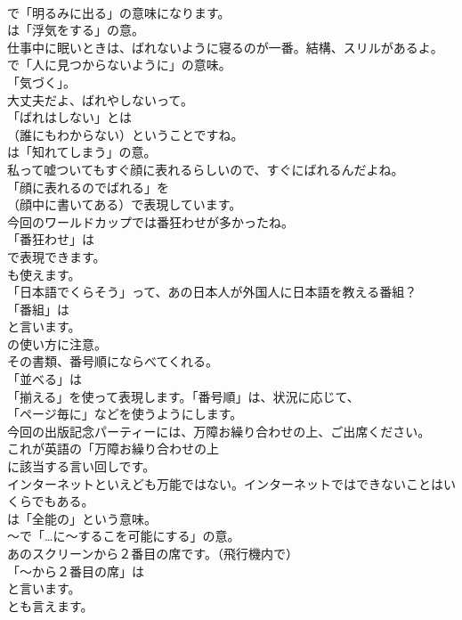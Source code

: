 \documentclass[8pt]{extreport}
\begin{document}
\begin{CJK}{UTF8}{min}
\\	で「明るみに出る」の意味になります。
\\	は「浮気をする」の意。	
\\	仕事中に眠いときは、ばれないように寝るのが一番。結構、スリルがあるよ。 
\\	で「人に見つからないように」の意味。
\\	「気づく」。	
\\	大丈夫だよ、ばれやしないって。 
\\	「ばれはしない」とは 
\\	（誰にもわからない）ということですね。
\\	は「知れてしまう」の意。	
\\	私って嘘ついてもすぐ顔に表れるらしいので、すぐにばれるんだよね。 
\\	「顔に表れるのでばれる」を 
\\	（顔中に書いてある）で表現しています。	
\\	今回のワールドカップでは番狂わせが多かったね。 
\\	「番狂わせ」は 
\\	で表現できます。
\\	も使えます。	
\\	「日本語でくらそう」って、あの日本人が外国人に日本語を教える番組？ 
\\	「番組」は
\\	と言います。
\\	の使い方に注意。	
\\	その書類、番号順にならべてくれる。 
\\	「並べる」は
\\	「揃える」を使って表現します。「番号順」は、状況に応じて、
\\	「ページ毎に」などを使うようにします。	
\\	今回の出版記念パーティーには、万障お繰り合わせの上、ご出席ください。 
\\	これが英語の「万障お繰り合わせの上 
\\	に該当する言い回しです。	
\\	インターネットといえども万能ではない。インターネットではできないことはいくらでもある。 
\\	は「全能の」という意味。
\\	～で「…に～するこを可能にする」の意。	
\\	あのスクリーンから２番目の席です。（飛行機内で） 
\\	「～から２番目の席」は
\\	と言います。
\\	とも言えます。	

\end{CJK}
\end{document}
